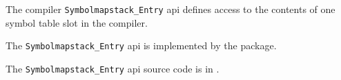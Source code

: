 
The compiler {\tt Symbolmapstack\_Entry} api defines access to the contents of one symbol 
table slot in the compiler.

The {\tt Symbolmapstack\_Entry} api is implemented by the  package.

The {\tt Symbolmapstack\_Entry} api source code is in .
